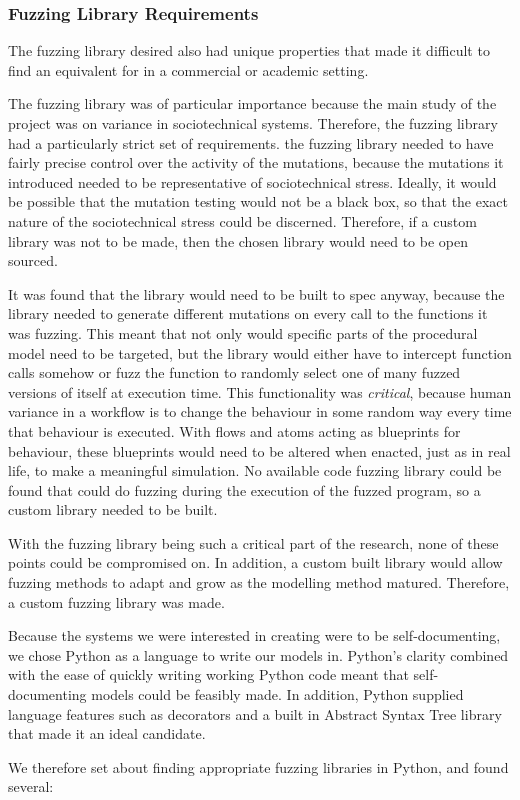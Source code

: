 \subsubsection{Fuzzing Library Requirements}\label{planning_fuzzing_requirements}
The fuzzing library desired also had unique properties that made it difficult to find an equivalent for in a commercial or academic setting. \par
The fuzzing library was of particular importance because the main study of the project was on variance in sociotechnical systems. Therefore, the fuzzing library had a particularly strict set of requirements. the fuzzing library needed to have fairly precise control over the activity of the mutations, because the mutations it introduced needed to be representative of sociotechnical stress. Ideally, it would be possible that the mutation testing would not be a black box, so that the exact nature of the sociotechnical stress could be discerned. Therefore, if a custom library was not to be made, then the chosen library would need to be open sourced. \par
It was found that the library would need to be built to spec anyway, because the library needed to generate different mutations on every call to the functions it was fuzzing. This meant that not only would specific parts of the procedural model need to be targeted, but the library would either have to intercept function calls somehow or fuzz the function to randomly select one of many fuzzed versions of itself at execution time. This functionality was \emph{critical}, because human variance in a workflow is to change the behaviour in some random way every time that behaviour is executed. With flows and atoms acting as blueprints for behaviour, these blueprints would need to be altered when enacted, just as in real life, to make a meaningful simulation. No available code fuzzing library could be found that could do fuzzing during the execution of the fuzzed program, so a custom library needed to be built. \par
With the fuzzing library being such a critical part of the research, none of these points could be compromised on. In addition, a custom built library would allow fuzzing methods to adapt and grow as the modelling method matured. Therefore, a custom fuzzing library was made. \par

\label{research_fuzzing}
Because the systems we were interested in creating were to be self-documenting, we chose Python as a language to write our models in. Python's clarity combined with the ease of quickly writing working Python code meant that self-documenting models could be feasibly made. In addition, Python supplied language features such as decorators and a built in Abstract Syntax Tree library that made it an ideal candidate. \par
We therefore set about finding appropriate fuzzing libraries in Python, and found several:
